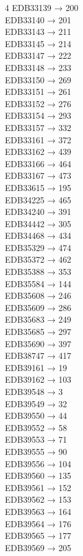 \begin{multicols}{4}
EDB33139 → 200\\
EDB33140 → 201\\
EDB33143 → 211\\
EDB33145 → 214\\
EDB33147 → 222\\
EDB33148 → 233\\
EDB33150 → 269\\
EDB33151 → 261\\
EDB33152 → 276\\
EDB33154 → 293\\
EDB33157 → 332\\
EDB33161 → 372\\
EDB33162 → 439\\
EDB33166 → 464\\
EDB33167 → 473\\
EDB33615 → 195\\
EDB34225 → 465\\
EDB34240 → 391\\
EDB34442 → 305\\
EDB34468 → 434\\
EDB35329 → 474\\
EDB35372 → 462\\
EDB35388 → 353\\
EDB35584 → 144\\
EDB35608 → 246\\
EDB35609 → 286\\
EDB35683 → 249\\
EDB35685 → 297\\
EDB35690 → 397\\
EDB38747 → 417\\
EDB39161 → 19\\
EDB39162 → 103\\
EDB39548 → 3\\
EDB39549 → 32\\
EDB39550 → 44\\
EDB39552 → 58\\
EDB39553 → 71\\
EDB39555 → 90\\
EDB39556 → 104\\
EDB39560 → 135\\
EDB39561 → 152\\
EDB39562 → 153\\
EDB39563 → 164\\
EDB39564 → 176\\
EDB39565 → 177\\
EDB39569 → 205\\

\end{multicols}
